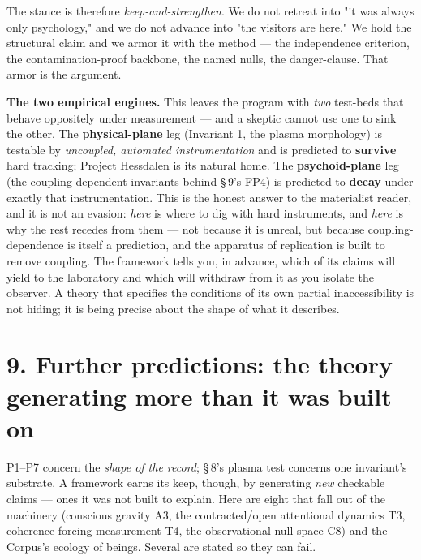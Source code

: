 \documentclass[11pt]{article}
\begin{document}
The stance is therefore \emph{keep-and-strengthen}. We do not retreat into "it was always only psychology," and we do not advance into "the visitors are here." We hold the structural claim and we armor it with the method --- the independence criterion, the contamination-proof backbone, the named nulls, the danger-clause. That armor is the argument.

\textbf{The two empirical engines.} This leaves the program with \emph{two} test-beds that behave oppositely under measurement --- and a skeptic cannot use one to sink the other. The \textbf{physical-plane} leg (Invariant 1, the plasma morphology) is testable by \emph{uncoupled, automated instrumentation} and is predicted to \textbf{survive} hard tracking; Project Hessdalen is its natural home. The \textbf{psychoid-plane} leg (the coupling-dependent invariants behind \S\,9's FP4) is predicted to \textbf{decay} under exactly that instrumentation. This is the honest answer to the materialist reader, and it is not an evasion: \emph{here} is where to dig with hard instruments, and \emph{here} is why the rest recedes from them --- not because it is unreal, but because coupling-dependence is itself a prediction, and the apparatus of replication is built to remove coupling. The framework tells you, in advance, which of its claims will yield to the laboratory and which will withdraw from it as you isolate the observer. A theory that specifies the conditions of its own partial inaccessibility is not hiding; it is being precise about the shape of what it describes.

\section*{9. Further predictions: the theory generating more than it was built on}
P1--P7 concern the \emph{shape of the record}; \S\,8's plasma test concerns one invariant's substrate. A framework earns its keep, though, by generating \emph{new} checkable claims --- ones it was not built to explain. Here are eight that fall out of the machinery (conscious gravity A3, the contracted/open attentional dynamics T3, coherence-forcing measurement T4, the observational null space C8) and the Corpus's ecology of beings. Several are stated so they can fail.
\end{document}
